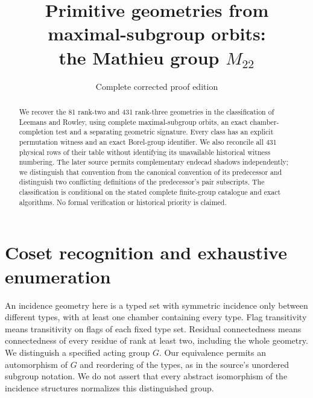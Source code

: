\documentclass[11pt,a4paper]{article}
\title{Primitive geometries from maximal-subgroup orbits:\\the Mathieu group $M_{22}$}
\author{Complete corrected proof edition}
\date{}
\begin{document}
\maketitle
\begin{abstract}
We recover the 81 rank-two and 431 rank-three geometries in the classification of Leemans and Rowley, using complete maximal-subgroup orbits, an exact chamber-completion test and a separating geometric signature. Every class has an explicit permutation witness and an exact Borel-group identifier. We also reconcile all 431 physical rows of their table without identifying its unavailable historical witness numbering. The later source permits complementary endecad shadows independently; we distinguish that convention from the canonical convention of its predecessor and distinguish two conflicting definitions of the predecessor's pair subscripts. The classification is conditional on the stated complete finite-group catalogue and exact algorithms. No formal verification or historical priority is claimed.
\end{abstract}

\section{Coset recognition and exhaustive enumeration}
An incidence geometry here is a typed set with symmetric incidence only between different types, with at least one chamber containing every type. Flag transitivity means transitivity on flags of each fixed type set. Residual connectedness means connectedness of every residue of rank at least two, including the whole geometry. We distinguish a specified acting group $G$. Our equivalence permits an automorphism of $G$ and reordering of the types, as in the source's unordered subgroup notation. We do not assert that every abstract isomorphism of the incidence structures normalizes this distinguished group.
\end{document}
